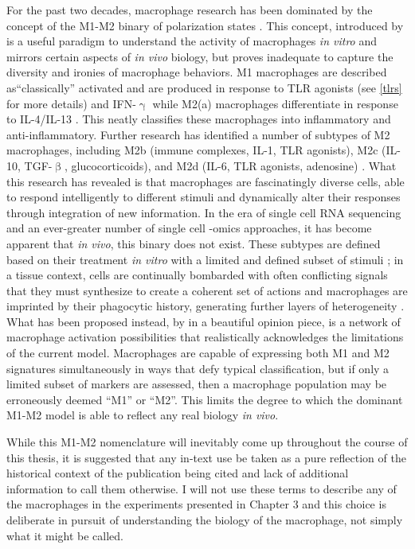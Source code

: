 For the past two decades, macrophage research has been dominated by the concept of the M1\hyp{}M2 binary of polarization states \citep{Italiani2014, Mills2015}. This concept, introduced by \citet{Mills2000} is a useful paradigm to understand the activity of macrophages \textit{in vitro} and mirrors certain aspects of \textit{in vivo} biology, but proves inadequate to capture the diversity and ironies of macrophage behaviors. M1 macrophages are described as``classically'' activated and are produced in response to TLR agonists (see \autoref{tlrs} for more details) and IFN\hyp{}$\upgamma$  while M2(a) macrophages differentiate in response to IL\hyp{}4/IL\hyp{}13 \citep{Mills2014, Wynn2013}. This neatly classifies these macrophages into inflammatory and anti\hyp{}inflammatory. Further research has identified a number of subtypes of M2 macrophages, including M2b (immune complexes, IL\hyp{}1, TLR agonists), M2c (IL\hyp{}10, TGF\hyp{}$\upbeta$, glucocorticoids), and M2d (IL\hyp{}6, TLR agonists, adenosine) \citep{Huang2018}. What this research has revealed is that macrophages are fascinatingly diverse cells, able to respond intelligently to different stimuli and dynamically alter their responses through integration of new information. In the era of single cell RNA sequencing and an ever\hyp{}greater number of single cell \hyp{}omics approaches, it has become apparent that \textit{in vivo}, this binary does not exist. These subtypes are defined based on their treatment \textit{in vitro} with a limited and defined subset of stimuli \citep{Gosselin2014, Wynn2013}; in a tissue context, cells are continually bombarded with often conflicting signals that they must synthesize to create a coherent set of actions \citep{Murray2014} and macrophages are imprinted by their phagocytic history, generating further layers of heterogeneity \citep{Gonzalez2017}. What has been proposed instead, by \citet{Nahrendorf2016} in a beautiful opinion piece, is a network of macrophage activation possibilities that realistically acknowledges the limitations of the current model. Macrophages are capable of expressing both M1 and M2 signatures simultaneously in ways that defy typical classification, but if only a limited subset of markers are assessed, then a macrophage population may be erroneously deemed ``M1'' or ``M2''. This limits the degree to which the dominant M1\hyp{}M2 model is able to reflect any real biology \textit{in vivo}. 

While this M1\hyp{}M2 nomenclature will inevitably come up throughout the course of this thesis, it is suggested that any in\hyp{}text use be taken as a pure reflection of the historical context of the publication being cited and lack of additional information to call them otherwise. I will not use these terms to describe any of the macrophages in the experiments presented in Chapter 3 and this choice is deliberate in pursuit of understanding the biology of the macrophage, not simply what it might be called.

